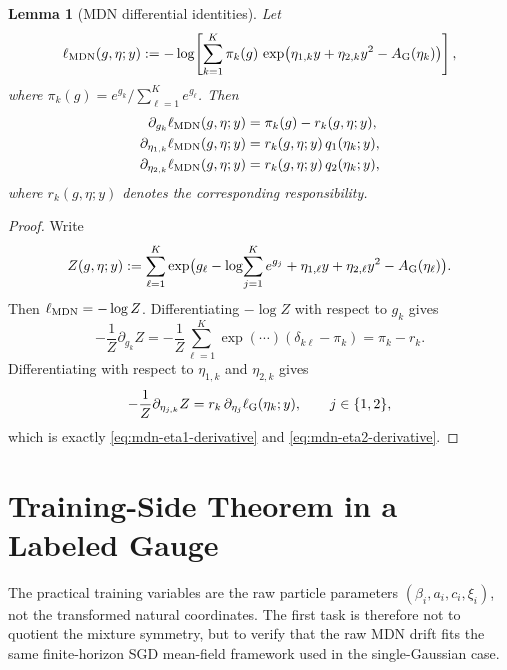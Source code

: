\documentclass[11pt]{article}
\newtheorem{lemma}[theorem]{Lemma}
\theoremstyle{definition}
\begin{document}
\begin{lemma}[MDN differential identities]
\label{lem:mdn-differential-identities}
Let
\[
  \ell_{\rm MDN}(g,\eta;y)
  :=
  -\log\!\left[
    \sum_{k=1}^K
    \pi_k(g)\,
    \exp\!\big(
      \eta_{1,k}y+\eta_{2,k}y^2-A_{\rm G}(\eta_k)
    \big)
  \right],
\]
where $\pi_k(g)=e^{g_k}/\sum_{\ell=1}^K e^{g_\ell}$. Then
\begin{align}
  \partial_{g_k}\ell_{\rm MDN}(g,\eta;y)
  &=
  \pi_k(g)-r_k(g,\eta;y),
  \label{eq:mdn-gate-derivative}
  \\
  \partial_{\eta_{1,k}}\ell_{\rm MDN}(g,\eta;y)
  &=
  r_k(g,\eta;y)\,q_1(\eta_k;y),
  \label{eq:mdn-eta1-derivative}
  \\
  \partial_{\eta_{2,k}}\ell_{\rm MDN}(g,\eta;y)
  &=
  r_k(g,\eta;y)\,q_2(\eta_k;y),
  \label{eq:mdn-eta2-derivative}
\end{align}
where $r_k(g,\eta;y)$ denotes the corresponding responsibility.
\end{lemma}

\begin{proof}
Write
\[
  Z(g,\eta;y)
  :=
  \sum_{\ell=1}^K
  \exp\!\big(
    g_\ell-\log\!\sum_{j=1}^K e^{g_j}
    +\eta_{1,\ell}y+\eta_{2,\ell}y^2-A_{\rm G}(\eta_\ell)
  \big).
\]
Then $\ell_{\rm MDN}=-\log Z$. Differentiating $-\log Z$ with respect to $g_k$
gives
\[
  -\frac{1}{Z}\partial_{g_k}Z
  =
  -\frac{1}{Z}\sum_{\ell=1}^K
  \exp(\cdots)(\delta_{k\ell}-\pi_k)
  =
  \pi_k-r_k.
\]
Differentiating with respect to $\eta_{1,k}$ and $\eta_{2,k}$ gives
\[
  -\frac{1}{Z}\partial_{\eta_{j,k}}Z
  =
  r_k\,\partial_{\eta_j}\ell_{\rm G}(\eta_k;y),
  \qquad j\in\{1,2\},
\]
which is exactly \eqref{eq:mdn-eta1-derivative} and
\eqref{eq:mdn-eta2-derivative}.
\end{proof}

\section{Training-Side Theorem in a Labeled Gauge}

The practical training variables are the raw particle parameters
$(\beta_i,a_i,c_i,\xi_i)$, not the transformed natural coordinates. The first
task is therefore not to quotient the mixture symmetry, but to verify that the
raw MDN drift fits the same finite-horizon SGD mean-field framework used in the
single-Gaussian case.
\end{document}
